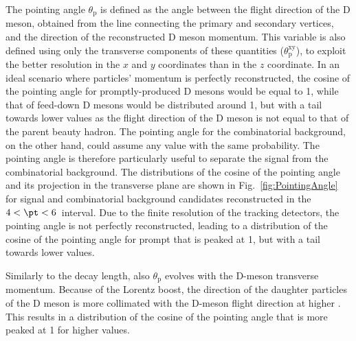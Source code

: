 The pointing angle $\theta_\mathrm{p}$ is defined as the angle between the flight direction of the D meson, obtained from the line connecting the primary and secondary vertices, and the direction of the reconstructed D meson momentum. This variable is also defined using only the transverse components of these quantities ($\theta_\mathrm{p}^{\mathrm{xy}}$), to exploit the better resolution in the $x$ and $y$ coordinates than in the $z$ coordinate. In an ideal scenario where particles' momentum is perfectly reconstructed, the cosine of the pointing angle for promptly-produced D mesons would be equal to 1, while that of feed-down D mesons would be distributed around 1, but with a tail towards lower values as the flight direction of the D meson is not equal to that of the parent beauty hadron. The pointing angle for the combinatorial background, on the other hand, could assume any value with the same probability. The pointing angle is therefore particularly useful to separate the signal from the combinatorial background. The distributions of the cosine of the pointing angle and its projection in the transverse plane are shown in Fig.~\ref{fig:PointingAngle} for signal and combinatorial background candidates reconstructed in the $4 < \pt < 6$~\gevc interval. Due to the finite resolution of the tracking detectors, the pointing angle is not perfectly reconstructed, leading to a distribution of the cosine of the pointing angle for prompt \ds that is peaked at 1, but with a tail towards lower values.

Similarly to the decay length, also $\theta_\mathrm{p}$ evolves with the D-meson transverse momentum. Because of the Lorentz boost, the direction of the daughter particles of the D meson is more collimated with the D-meson flight direction at higher \pt. This results in a distribution of the cosine of the pointing angle that is more peaked at 1 for higher \pt values.

